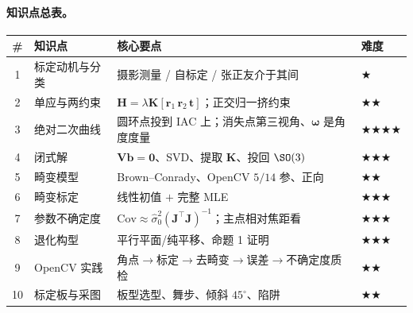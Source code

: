 \paragraph{知识点总表。}
\begin{table}[ht]\centering\small
\begin{tabular}{clll}
\toprule
\# & 知识点 & 核心要点 & 难度 \\
\midrule
1 & 标定动机与分类 & 摄影测量 / 自标定 / 张正友介于其间 & $\bigstar$ \\
2 & 单应与两约束 & $\mathbf{H}=\lambda\mathbf{K}[\mathbf{r}_1\,\mathbf{r}_2\,\mathbf{t}]$；正交归一挤约束 & $\bigstar\bigstar$ \\
3 & 绝对二次曲线 & 圆环点投到 IAC 上；消失点第三视角、$\boldsymbol{\omega}$ 是角度度量 & $\bigstar\bigstar\bigstar\bigstar$ \\
4 & 闭式解 & $\mathbf{V}\mathbf{b}=\mathbf{0}$、SVD、提取 $\mathbf{K}$、投回 $\SO(3)$ & $\bigstar\bigstar\bigstar$ \\
5 & 畸变模型 & Brown--Conrady、OpenCV $5/14$ 参、正向 & $\bigstar\bigstar$ \\
6 & 畸变标定 & 线性初值 $+$ 完整 MLE & $\bigstar\bigstar\bigstar$ \\
7 & 参数不确定度 & $\mathrm{Cov}\approx\hat\sigma_0^2(\mathbf{J}^\top\mathbf{J})^{-1}$；主点相对焦距看 & $\bigstar\bigstar\bigstar$ \\
8 & 退化构型 & 平行平面/纯平移、命题 1 证明 & $\bigstar\bigstar\bigstar$ \\
9 & OpenCV 实践 & 角点$\to$标定$\to$去畸变$\to$误差$\to$不确定度质检 & $\bigstar\bigstar$ \\
10 & 标定板与采图 & 板型选型、舞步、倾斜 $45^\circ$、陷阱 & $\bigstar\bigstar$ \\
\bottomrule
\end{tabular}
\end{table}

